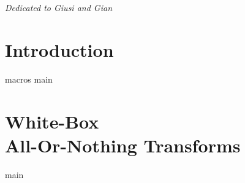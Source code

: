 \documentclass[12pt,a4paper,oldfontcommands,openright,oneside]{memoir}
\begin{document}


\cleardoublepage

\cleardoublepage
\thispagestyle{empty}
\begin{abstract}
{main}
\end{abstract}
\cleardoublepage




\tableofcontents*
\cleardoublepage

\listoffigures*
\cleardoublepage



\cleardoublepage
\thispagestyle{empty}
\begin{flushright}
	\itshape Dedicated to Giusi and Gian\\
\end{flushright}
\cleardoublepage




\chapter[Introduction]{Introduction}
\label{chap:intro}
{macros}
{main}

\chapter[White-Box All-Or-Nothing Transforms]{White-Box\\All-Or-Nothing Transforms}
\label{chap:waont}
{main}
\end{document}
